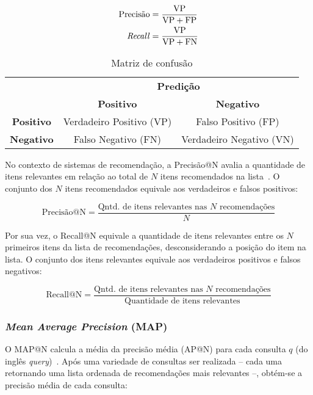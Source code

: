   \begin{align}
    \text{Precisão} &= \frac{\text{VP}}{\text{VP} + \text{FP}} \\
    \text{\textit{Recall}} &= \frac{\text{VP}}{\text{VP} + \text{FN}}
  \end{align}

  \begin{table}[H]
    \centering
    \begin{tabular}{c|c|c|}
      \cline{2-3}
      & \multicolumn{2}{c|}{\textbf{Predição}} \\ \cline{2-3} 
      & \textbf{Positivo} & \textbf{Negativo} \\ \hline
      \multicolumn{1}{|c|}{\textbf{Positivo}} & Verdadeiro Positivo (VP) & Falso Positivo (FP) \\ \hline
      \multicolumn{1}{|c|}{\textbf{Negativo}} & Falso Negativo (FN) & Verdadeiro Negativo (VN) \\ \hline
    \end{tabular}
    \caption{Matriz de confusão}
    \label{tab:confusion_matrix}
  \end{table}

  No contexto de sistemas de recomendação, a Precisão@N avalia a quantidade de
  itens relevantes em relação ao total de $N$ itens recomendados na lista~\cite{sessionbaseddp}. O conjunto
  dos $N$ itens recomendados equivale aos verdadeiros e falsos positivos:

  \begin{equation}
    \text{Precisão@N} = \frac{\text{Qntd. de itens relevantes nas } N \text{ recomendações}}{N}
  \end{equation}

  Por sua vez, o Recall@N equivale a quantidade de itens relevantes entre
  os $N$ primeiros itens da lista de recomendações, desconsiderando a
  posição do item na lista. O conjunto dos itens relevantes equivale
  aos verdadeiros positivos e falsos negativos:

  \begin{equation}
    \text{Recall@N} = \frac{\text{Qntd. de itens relevantes nas } N \text{ recomendações}}{\text{Quantidade de itens relevantes}}
  \end{equation}

  \subsubsection{\textit{Mean Average Precision} (MAP)} O MAP@N calcula a média
  da precisão média (AP@N) para cada consulta $q$ (do inglês
  \textit{query})~\cite{carnevali2023offline}. Após uma variedade de consultas
  ser realizada -- cada uma retornando uma lista ordenada de recomendações mais
  relevantes --, obtém-se a precisão média de cada consulta:
  
